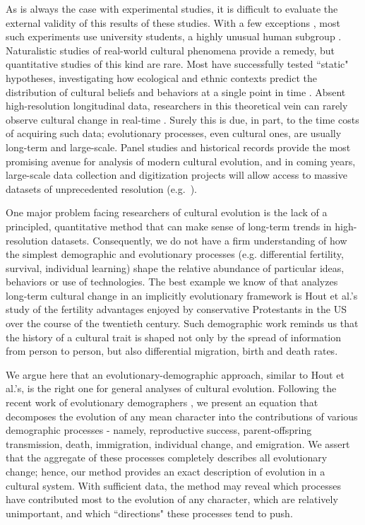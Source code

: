 \documentclass[11pt]{article}
\begin{document}
As is always the case with experimental studies, it is difficult to evaluate the external validity of this results of these studies.  With a few exceptions \citep{paciotti2003ultimatum, efferson2007learning, chudek2011prestige}, most such experiments use university students, a highly unusual human subgroup \citep{henrich2010weirdest}. Naturalistic studies of real-world cultural phenomena provide a remedy, but quantitative studies of this kind are rare. Most have successfully tested ``static" hypotheses, investigating how ecological and ethnic contexts predict the distribution of cultural beliefs and behaviors at a single point in time \citep{paciotti2003ultimatum, mcelreath2004social, henrich2010evolution, henrich2011nature}. Absent high-resolution longitudinal data, researchers in this theoretical vein can rarely observe cultural change in real-time \citep{gravlee2009methods}. Surely this is due, in part, to the time costs of acquiring such data; evolutionary processes, even cultural ones, are usually long-term and large-scale. Panel studies and historical records provide the most promising avenue for analysis of modern cultural evolution, and in coming years, large-scale data collection and digitization projects will allow access to massive datasets of unprecedented resolution (e.g.~\citealp{michel2011quantitative}).

One major problem facing researchers of cultural evolution is the lack of a principled, quantitative method that can make sense of long-term trends in high-resolution datasets. Consequently, we do not have a firm understanding of how the simplest demographic and evolutionary processes (e.g. differential fertility, survival, individual learning) shape the relative abundance of particular ideas, behaviors or use of technologies.  The best example we know of that analyzes long-term cultural change in an implicitly evolutionary framework is Hout et al.'s \citeyearpar{hout2001demographic} study of the fertility advantages enjoyed by conservative Protestants in the US over the course of the twentieth century. Such demographic work reminds us that the history of a cultural trait is shaped not only by the spread of information from person to person, but also differential migration, birth and death rates.

We argue here that an evolutionary-demographic approach, similar to Hout et al.'s, is the right one for general analyses of cultural evolution. Following the recent work of evolutionary demographers \citep{coulson2008dynamics, ozgul2009dynamics}, we present an equation that decomposes the evolution of any mean character into the contributions of various demographic processes - namely, reproductive success, parent-offspring transmission, death, immigration, individual change, and emigration. We assert that the aggregate of these processes completely describes all evolutionary change; hence, our method provides an exact description of evolution in a cultural system.  With sufficient data, the method may reveal which processes have contributed most to the evolution of any character, which are relatively unimportant, and which ``directions" these processes tend to push.
\end{document}
